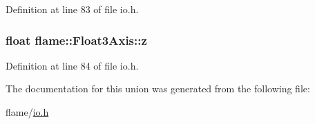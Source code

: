 Definition at line 83 of file io.\-h.

\hypertarget{unionflame_1_1_float3_axis_afa8c67d320f90af628196854ac8c7de1}{
\subsubsection[{z}]{\setlength{\rightskip}{0pt plus 5cm}float flame\-::\-Float3\-Axis\-::z}}\label{unionflame_1_1_float3_axis_afa8c67d320f90af628196854ac8c7de1}


Definition at line 84 of file io.\-h.



The documentation for this union was generated from the following file\-:\begin{DoxyCompactItemize}
\item 
flame/\hyperlink{io_8h}{io.\-h}\end{DoxyCompactItemize}
